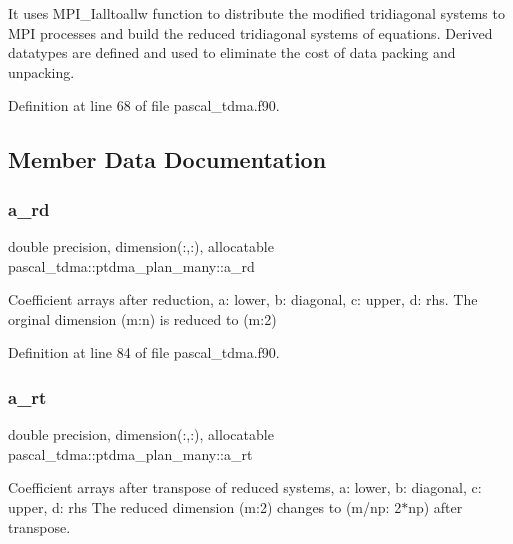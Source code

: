 It uses M\+P\+I\+\_\+\+Ialltoallw function to distribute the modified tridiagonal systems to M\+PI processes and build the reduced tridiagonal systems of equations. Derived datatypes are defined and used to eliminate the cost of data packing and unpacking. 

Definition at line 68 of file pascal\+\_\+tdma.\+f90.



\subsection{Member Data Documentation}
\mbox{\label{structpascal__tdma_1_1ptdma__plan__many_a6d9101716eca623dc8c45075788f06bd}} 
\subsubsection{\texorpdfstring{a\_rd}{a\_rd}}
{\footnotesize\ttfamily double precision, dimension(\+:,\+:), allocatable pascal\+\_\+tdma\+::ptdma\+\_\+plan\+\_\+many\+::a\+\_\+rd}



Coefficient arrays after reduction, a\+: lower, b\+: diagonal, c\+: upper, d\+: rhs. The orginal dimension (m\+:n) is reduced to (m\+:2) 



Definition at line 84 of file pascal\+\_\+tdma.\+f90.

\mbox{\label{structpascal__tdma_1_1ptdma__plan__many_a42be039aee75c5393c22111cf232e77d}} 
\subsubsection{\texorpdfstring{a\_rt}{a\_rt}}
{\footnotesize\ttfamily double precision, dimension(\+:,\+:), allocatable pascal\+\_\+tdma\+::ptdma\+\_\+plan\+\_\+many\+::a\+\_\+rt}



Coefficient arrays after transpose of reduced systems, a\+: lower, b\+: diagonal, c\+: upper, d\+: rhs The reduced dimension (m\+:2) changes to (m/np\+: 2$\ast$np) after transpose. 



